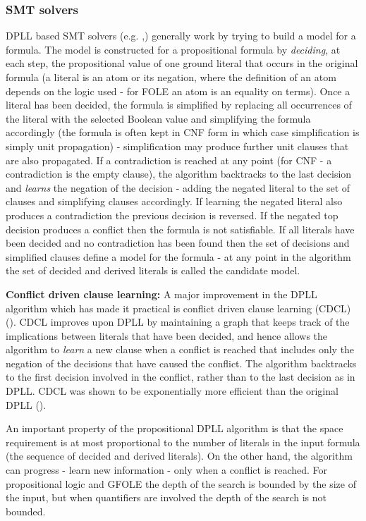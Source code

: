 \subsubsection*{SMT solvers}
DPLL based SMT solvers (e.g. \cite{DBLP:conf/cav/BarrettCDHJKRT11},\cite{DBLP:conf/tacas/MouraB08}) generally work by trying to build a model for a formula. The model is constructed for a propositional formula by \textit{deciding}, at each step, the propositional value of one ground literal that occurs in the original formula (a literal is an atom or its negation, where the definition of an atom depends on the logic used - for FOLE an atom is an equality on terms). Once a literal has been decided, the formula is simplified by replacing all occurrences of the literal with the selected Boolean value and simplifying the formula accordingly (the formula is often kept in CNF form in which case simplification is simply unit propagation) - simplification may produce further unit clauses that are also propagated. 
If a contradiction is reached at any point (for CNF - a contradiction is the empty clause), the algorithm backtracks to the last decision and \textit{learns} the negation of the decision - adding the negated literal to the set of clauses and simplifying clauses accordingly. If learning the negated literal also produces a contradiction the previous decision is reversed. If the negated top decision produces a conflict then the formula is not satisfiable.
If all literals have been decided and no contradiction has been found then the set of decisions and simplified clauses define a model for the formula - at any point in the algorithm the set of decided and derived literals is called the candidate model. 

\textbf{Conflict driven clause learning:} A major improvement in the DPLL algorithm which has made it practical is conflict driven clause learning (CDCL) (\cite{GRASP}). CDCL improves upon DPLL by maintaining a graph that keeps track of the implications between literals that have been decided, and hence allows the algorithm to \textit{learn} a new clause when a conflict is reached that includes only the negation of the decisions that have caused the conflict. The algorithm backtracks to the first decision involved in the conflict, rather than to the last decision as in DPLL. CDCL was shown to be exponentially more efficient than the original DPLL (\cite{DBLP:conf/aaai/HertelBPG08}).

An important property of the propositional DPLL algorithm is that the space requirement is at most proportional to the number of literals in the input formula (the sequence of decided and derived literals). On the other hand, the algorithm can progress - learn new information - only when a conflict is reached. For propositional logic and GFOLE the depth of the search is bounded by the size of the input, but when quantifiers are involved the depth of the search is not bounded.

